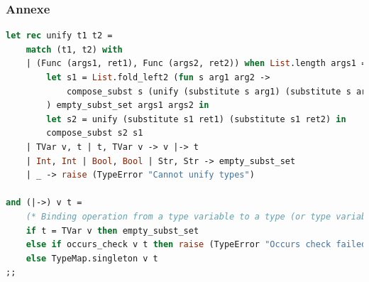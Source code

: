 \documentclass{beamer}
\begin{document}
\begin{frame}[fragile]
		\frametitle{Annexe}
		\begin{lstlisting}[language=ml]
let rec unify t1 t2 =
    match (t1, t2) with
    | (Func (args1, ret1), Func (args2, ret2)) when List.length args1 = List.length args2 ->
        let s1 = List.fold_left2 (fun s arg1 arg2 -> 
            compose_subst s (unify (substitute s arg1) (substitute s arg2))
        ) empty_subst_set args1 args2 in
        let s2 = unify (substitute s1 ret1) (substitute s1 ret2) in
        compose_subst s2 s1
    | TVar v, t | t, TVar v -> v |-> t
    | Int, Int | Bool, Bool | Str, Str -> empty_subst_set
    | _ -> raise (TypeError "Cannot unify types")

and (|->) v t =
    (* Binding operation from a type variable to a type (or type variable) *)
    if t = TVar v then empty_subst_set
    else if occurs_check v t then raise (TypeError "Occurs check failed")
    else TypeMap.singleton v t
;;


		\end{lstlisting}
\end{frame}
\end{document}
